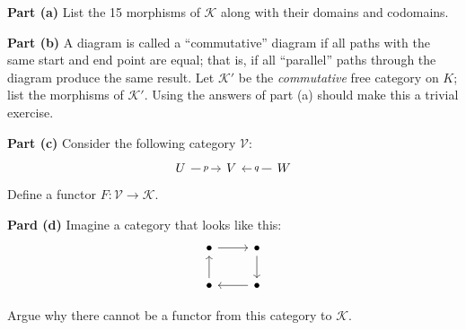 \documentclass[11pt]{amsart}
\begin{document}
\bigskip

\textbf{Part (a)} List the 15 morphisms of $\mathcal{K}$ along with their
domains and codomains.

\textbf{Part (b)} A diagram is called a ``commutative'' diagram if all paths
with the same start and end point are equal; that is, if all ``parallel'' paths
through the diagram produce the same result. Let $\mathcal{K}'$ be the
\textit{commutative} free category on $K$; list the morphisms of
$\mathcal{K}'$. Using the answers of part (a) should make this a trivial
exercise.

\textbf{Part (c)} Consider the following category $\mathcal{V}$:
\[\begin{tikzcd}
  U & V & W
  \arrow["p"{description}, from=1-1, to=1-2]
  \arrow["q"{description}, from=1-3, to=1-2]
\end{tikzcd}\]
Define a functor $F : \mathcal{V} \to \mathcal{K}$.

\textbf{Pard (d)} Imagine a category that looks like this:
\[\begin{tikzcd}
	\bullet & \bullet \\
	\bullet & \bullet
	\arrow[from=1-1, to=1-2]
	\arrow[from=1-2, to=2-2]
	\arrow[from=2-1, to=1-1]
	\arrow[from=2-2, to=2-1]
\end{tikzcd}\]

Argue why there cannot be a functor from this category to $\mathcal{K}$.
\end{document}
